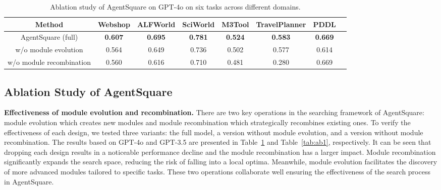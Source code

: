 \setlength{\tabcolsep}{1mm} 
\begin{table}[t!]
    \centering
    \begin{tabular}{cccccccc}
    \hline
    \textbf{Method} & \multicolumn{1}{c}{\textbf{Webshop}} & \multicolumn{1}{c}{\textbf{ALFWorld}} & \multicolumn{1}{c}{\textbf{SciWorld}} & \multicolumn{1}{c}{\textbf{M3Tool}} & \multicolumn{1}{c}{\textbf{TravelPlanner}}  
     & \multicolumn{1}{c}{\textbf{PDDL}}\\
    \hline
    AgentSquare (full) & \textbf{0.607} & \textbf{0.695} &\textbf{0.781}& \textbf{0.524} &\textbf{0.583}&\textbf{0.669}\\ 
    w/o module evolution& 0.564 & 0.649 &0.736& 0.502 &0.577 &0.614\\
    w/o module recombination& 0.560 & 0.616 &0.710& 0.481 &0.280 &0.669\\
    \hline
    \end{tabular}
    {\caption{Ablation study of AgentSquare on GPT-4o on six tasks across different domains.}
    \label{tab:ab2}}
\end{table}
\subsection{Ablation Study of AgentSquare} \label{technical}
\textbf{Effectiveness of module evolution and recombination.}
There are two key operations in the searching framework of AgentSquare: module evolution which creates new modules and module recombination which strategically recombines existing ones.
To verify the effectiveness of each design, we tested three variants: the full model, a version without module evolution, and a version without module recombination.
The results based on GPT-4o and GPT-3.5 are presented in Table~\ref{tab:ab2} and Table~\ref{tab:ab1}, respectively.
It can be seen that dropping each design results in a noticeable performance decline and the module recombination has a larger impact.
Module recombination significantly expands the search space, reducing the risk of falling into a local optima. 
Meanwhile, module evolution facilitates the discovery of more advanced modules tailored to specific tasks. 
These two operations collaborate well ensuring the effectiveness of the search process in AgentSquare.

